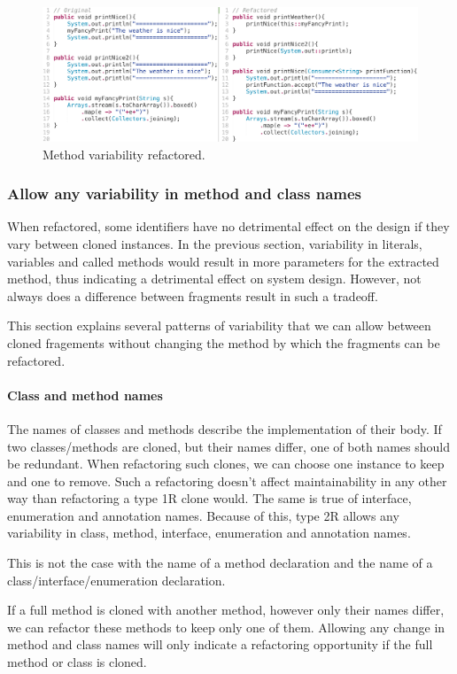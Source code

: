 \begin{figure}[H]
  \centering
  \includegraphics[width=1\columnwidth]{img/type2method}
  \caption{Method variability refactored.}
  \label{fig:type2method}
\end{figure}

\subsubsection{Allow any variability in method and class names}
When refactored, some identifiers have no detrimental effect on the design if they vary between cloned instances. In the previous section, variability in literals, variables and called methods would result in more parameters for the extracted method, thus indicating a detrimental effect on system design. However, not always does a difference between fragments result in such a tradeoff.

This section explains several patterns of variability that we can allow between cloned fragements without changing the method by which the fragments can be refactored.

\paragraph{Class and method names}
The names of classes and methods describe the implementation of their body. If two classes/methods are cloned, but their names differ, one of both names should be redundant. When refactoring such clones, we can choose one instance to keep and one to remove. Such a refactoring doesn't affect maintainability in any other way than refactoring a type 1R clone would. The same is true of interface, enumeration and annotation names. Because of this, type 2R allows any variability in class, method, interface, enumeration and annotation names.


This is not the case with the name of a method declaration and the name of a class/interface/enumeration declaration.

If a full method is cloned with another method, however only their names differ, we can refactor these methods to keep only one of them. Allowing any change in method and class names will only indicate a refactoring opportunity if the full method or class is cloned.

